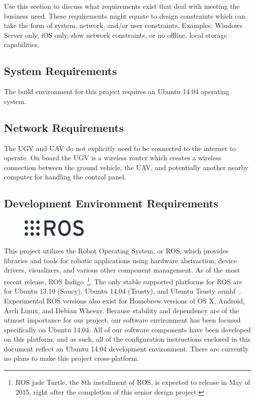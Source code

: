 Use this section to discuss what requirements exist that deal with meeting the 
business need.  These requirements might equate to design constraints which can 
take the form of system, network, and/or user constraints.  Examples:  Windows 
Server only, iOS only, slow network constraints, or no offline, local storage capabilities. 


\subsection{System  Requirements}
The build environment for this project requires an Ubuntu 14.04 operating system.

\subsection{Network Requirements}
The UGV and UAV do not explicitly need to be connected to the internet to operate. On board the UGV is a wireless router which creates a wireless connection between the ground vehicle, the UAV, and potentially another nearby computer for handling the control panel.

\subsection{Development Environment Requirements}\label{subsectionDevelopmentEnvironmentRequirements}
\begin{figure}
  \vspace{-20pt}

	\begin{center}
		\includegraphics[width=0.3\textwidth]{resources/img/rosorg-logo1}
	\end{center}
  \vspace{-15pt}

\end{figure}

This project utilizes the Robot Operating System, or ROS, which provides libraries and tools for robotic applications using hardware abstraction, device drivers, visualizers, and various other component management. As of the most recent release, ROS Indigo~\footnote{ROS jade Turtle, the 8th installment of ROS, is expected to release in May of 2015, right after the completion of this senior design project.}, The only stable supported platforms for ROS are for Ubuntu 13.10 (Saucy), Ubuntu 14.04 (Trusty), and  Ubuntu Trusty armhf~\cite{ROSorg}. Experimental ROS versions also exist for Homebrew versions of OS X, Android, Arch Linux, and Debian Wheezy. Because stability and dependency are of the utmost importance for our project, our software environment has been focused specifically on Ubuntu 14.04. All of our software components have been developed on this platform, and as such, all of the configuration instructions enclosed in this document reflect an Ubuntu 14.04 development environment. There are currently no plans to make this project cross-platform.


